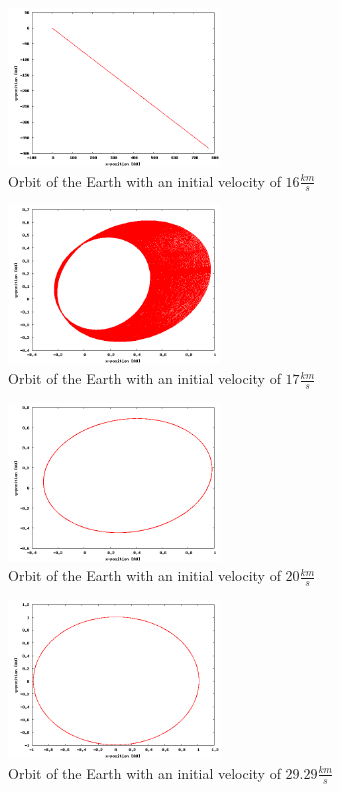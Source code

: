 \documentclass[a4wide,12pt]{article}
\begin{document}
\begin{figure}[p]
 \includegraphics[width=0.5\textwidth]{Earth16km}
 \caption{Orbit of the Earth with an initial velocity of $16 \frac{km}{s}$}
 \label{fig:01} 
\end{figure}
\begin{figure}[p]
 \includegraphics[width=0.5\textwidth]{Earth17km}
 \caption{Orbit of the Earth with an initial velocity of $17 \frac{km}{s}$}
 \label{fig:02} 
\end{figure}
\begin{figure}[p]
 \includegraphics[width=0.5\textwidth]{jord20km}
 \caption{Orbit of the Earth with an initial velocity of $20 \frac{km}{s}$}
 \label{fig:03} 
\end{figure}
\begin{figure}[p]
 \includegraphics[width=0.5\textwidth]{jordmedsol}
 \caption{Orbit of the Earth with an initial velocity of $29.29 \frac{km}{s}$}
 \label{fig:04} 
\end{figure}
\end{document}
